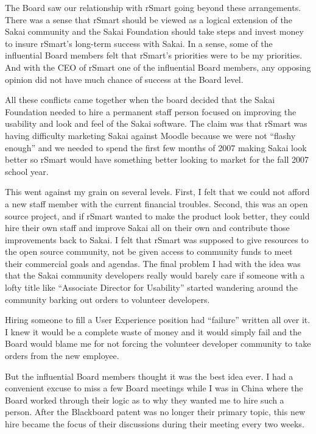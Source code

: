 \documentclass[12pt]{book}
\begin{document}
The Board saw our relationship with rSmart going beyond these arrangements.  There
was a sense that rSmart should be viewed as a logical extension of the Sakai community
and the Sakai Foundation should take steps and invest money to insure rSmart's
long-term success with Sakai.  In a sense, some of the influential Board members
felt that rSmart's priorities were to be my priorities.  And with the CEO of rSmart
one of the influential Board members, any opposing opinion did not have much chance
of success at the Board level.

All these conflicts came together when the board decided that the Sakai Foundation
needed to hire a permanent staff person focused on improving the usability and
look and feel of the Sakai software.  The claim was that rSmart was having difficulty
marketing Sakai against Moodle because we were not ``flashy enough'' and we needed
to spend the first few months of 2007 making Sakai look better so rSmart would have
something better looking to market for the fall 2007 school year.

This went against my grain on several levels.  First, I felt that we could not
afford a new staff member with the current financial troubles.  Second, this was
an open source project, and if rSmart wanted to make the product look better,
they could hire their own staff and improve Sakai all on their own and contribute
those improvements back to Sakai.  I felt
that rSmart was supposed to give resources to the open source community,
not be given access to community funds to meet their commercial goals and agendas.
The final problem I
had with the idea was that the Sakai community developers really would barely care
if someone with a lofty title like ``Associate Director for Usability'' started
wandering around the community barking out orders to volunteer developers.

Hiring someone to fill a User Experience position had ``failure'' written all over it.
I knew it would be a complete waste of
money and it would simply fail and the Board would blame me for not forcing
the volunteer developer community to take orders from the new employee.

But the influential Board members thought it was the best idea ever.
I had a convenient excuse to miss a few Board meetings while I was in China
where the Board worked through their logic as to why they wanted me to
hire such a person.   After the Blackboard patent was no longer their
primary topic, this new hire became the focus
of their discussions during their meeting every two weeks.
\end{document}
